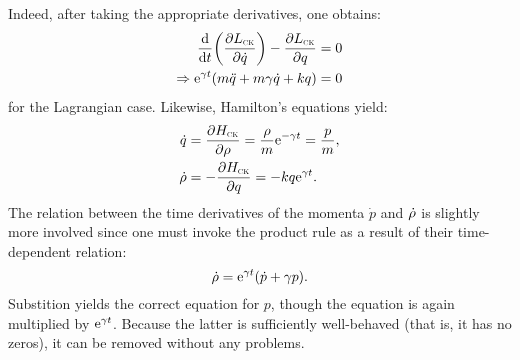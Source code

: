Indeed, after taking the appropriate derivatives, one obtains:
\begin{equation*} 
    \begin{split}
        \dv{}{t}\qty(\pdv{\ensuremath{L_\text{\tiny{\textsc{CK}}}}}{\dot{q}}) - \pdv{\ensuremath{L_\text{\tiny{\textsc{CK}}}}}{q} &= 0 \\
        \Rightarrow \mathrm{e}^{\gamma t}\qty(m\ddot{q} + m\gamma\dot{q} + kq) &= 0
    \end{split}
\end{equation*}
for the Lagrangian case. Likewise, Hamilton's equations yield: \cite{Tokieda2021}
\begin{equation*}
    \begin{split}
        \dot{q} &= \pdv{\ensuremath{H_\text{\tiny{\textsc{CK}}}}}{\ensuremath{\rho}} = \frac{\rho}{m}\mathrm{e}^{-\gamma t} =  \frac{p}{m}, \\
        \dot{\rho} &= -\pdv{\ensuremath{H_\text{\tiny{\textsc{CK}}}}}{q} = -kq\mathrm{e}^{\gamma t}.\\
    \end{split}
\end{equation*}
The relation between the time derivatives of the momenta $\dot{p}$ and $\dot{\rho}$ is slightly more involved since one must invoke the product rule as a result of their time-dependent relation:
\begin{equation}
    \dot{\rho} = \mathrm{e}^{\gamma t}\qty(\dot{p} + \gamma p).  
    \label{eq:momentum_relation}
\end{equation}
Substition yields the correct equation for $p$, though the equation is again multiplied by $\mathrm{e}^{\gamma t}$. Because the latter is sufficiently well-behaved (that is, it has no zeros), it can be removed without any problems.


